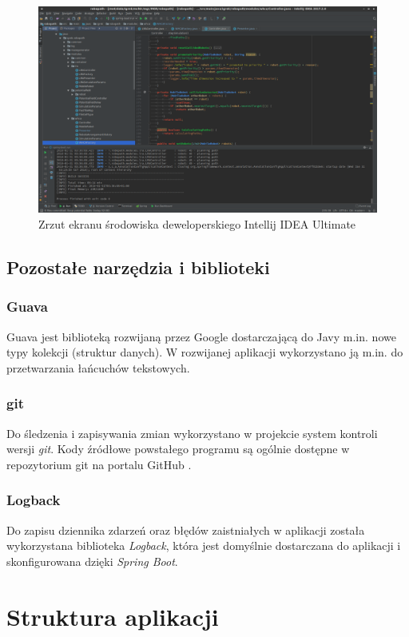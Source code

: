 \begin{figure}
	\centering
	\includegraphics[width=0.9\columnwidth]{img/robopath/intellij}
	\caption{Zrzut ekranu środowiska deweloperskiego Intellij IDEA Ultimate}
	\label{fig:app-tech-intellij}
\end{figure}

\subsection{Pozostałe narzędzia i biblioteki}
\subsubsection{Guava}
Guava jest biblioteką rozwijaną przez Google dostarczającą do Javy m.in. nowe typy kolekcji (struktur danych). W rozwijanej aplikacji wykorzystano ją m.in. do przetwarzania łańcuchów tekstowych.
\subsubsection{git}
Do śledzenia i zapisywania zmian wykorzystano w projekcie system kontroli wersji {\it git}.
Kody źródłowe powstałego programu są ogólnie dostępne w repozytorium git na portalu GitHub \cite{github-coop-pathfinder}.

\subsubsection{Logback}
Do zapisu dziennika zdarzeń oraz błędów zaistniałych w aplikacji została wykorzystana biblioteka {\it Logback}, która jest domyślnie dostarczana do aplikacji i skonfigurowana dzięki {\it Spring Boot}.


\section{Struktura aplikacji}
